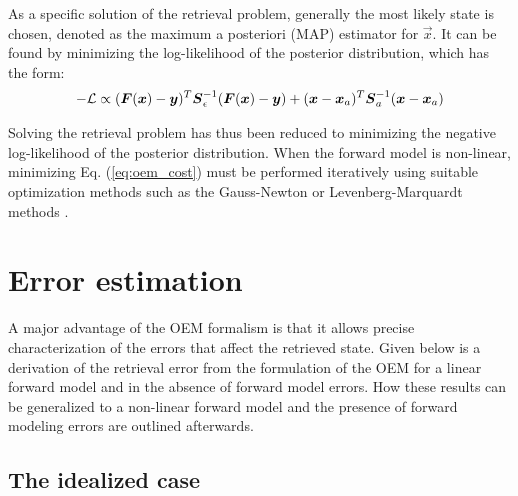As a specific solution of the retrieval problem, generally the most likely state is chosen,
denoted as the maximum a posteriori (MAP) estimator for $\vec{x}$. It can be found by minimizing
the log-likelihood of the posterior distribution, which has the form:
\begin{align}\label{eq:oem_cost}
  -\mathcal{L} \propto (\boldsymbol{F}(\boldsymbol{x}) - \boldsymbol{y})^T\boldsymbol{S}_\epsilon^{-1}(\boldsymbol{F}(\boldsymbol{x}) - \boldsymbol{y})
  + (\boldsymbol{x} - \boldsymbol{x}_a)^T \boldsymbol{S}_a^{-1} (\boldsymbol{x} - \boldsymbol{x}_a)
\end{align}

Solving the retrieval problem has thus been reduced to minimizing the negative log-likelihood of
the posterior distribution. When the forward model is non-linear, minimizing
Eq. (\ref{eq:oem_cost}) must be performed iteratively using suitable optimization methods such
as the Gauss-Newton or Levenberg-Marquardt methods \cite{boyd04}.

\section{Error estimation}

A major advantage of the OEM formalism is that it allows precise characterization of
the errors that affect the retrieved state. Given below is a derivation of the retrieval
error from the formulation of the OEM for a linear forward model and in the absence of
forward model errors. How these results can be generalized to a non-linear forward model
and the presence of forward modeling errors are outlined afterwards.

\subsection{The idealized case}

